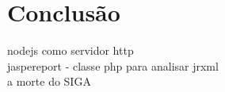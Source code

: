 \chapter{Conclusão}\label{cap:conclusao}

nodejs como servidor http\\
jaspereport - classe php para analisar jrxml\\
a morte do SIGA\\
